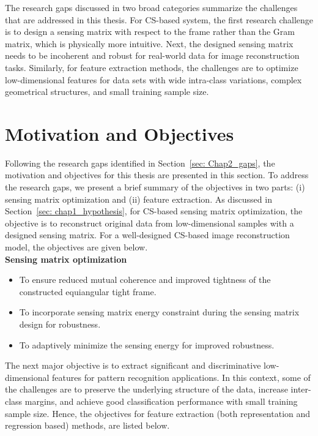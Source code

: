 %
The research gaps discussed in two broad categories summarize the challenges that are addressed in this thesis. For CS-based system, the first research challenge is to design a sensing matrix with respect to the frame rather than the Gram matrix, which is physically more intuitive. Next, the designed sensing matrix needs to be incoherent and robust for real-world data for image reconstruction tasks. Similarly, for feature extraction methods, the challenges are to optimize low-dimensional features for data sets with wide intra-class variations, complex geometrical structures, and small training sample size.
%
\section{Motivation and Objectives}
\label{sec: Chap2_Mot_obj}
%
Following the research gaps identified in Section~\ref{sec: Chap2_gaps}, the motivation and objectives for this thesis are presented in this section. 
To address the research gaps, we present a brief summary of the objectives in two parts: (i) sensing matrix optimization and (ii) feature extraction. As discussed in Section~\ref{sec: chap1_hypothesis}, for CS-based sensing matrix optimization, the objective is to reconstruct original data from low-dimensional samples with a designed sensing matrix. For a well-designed CS-based image reconstruction model, the objectives are given below.\\ 
%
\noindent\textbf{Sensing matrix optimization}
%
\begin{itemize}
    \item To ensure reduced mutual coherence and improved tightness of the constructed equiangular tight frame.
    \item To incorporate sensing matrix energy constraint during the sensing matrix design for robustness.
    \item To adaptively minimize the sensing energy for improved robustness.
\end{itemize}
%
\noindent The next major objective is to extract significant and discriminative low-dimensional features for pattern recognition applications. In this context, some of the challenges are to preserve the underlying structure of the data, increase inter-class margins, and achieve good classification performance with small training sample size. Hence, the objectives for feature extraction (both representation and regression based) methods, are listed below.\\
